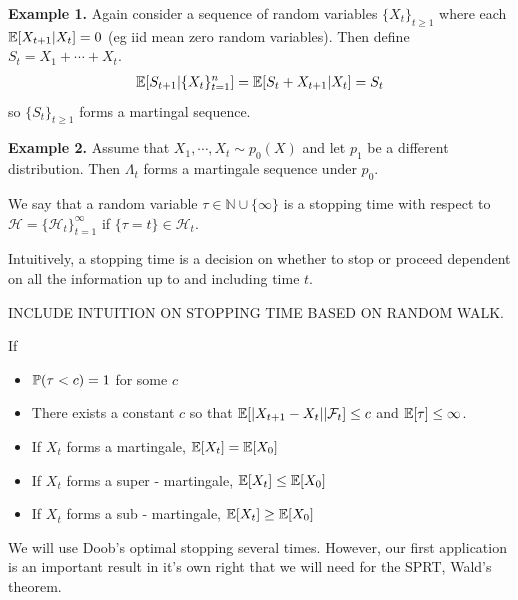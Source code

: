 \noindent\textbf{Example 1.} Again consider a sequence of random variables $\{X_t\}_{t\geq 1}$ where each $\E[X_{t+1}|X_t] = 0$ (eg iid mean zero random variables). Then define $S_t = X_1+\cdots + X_t$.
\begin{align*}
    \E[S_{t+1}|\{X_t\}_{t=1}^n] = \E[S_{t} + X_{t+1}|X_t] = S_t 
\end{align*}
so $\{S_t\}_{t\geq 1}$ forms a martingal sequence.

\noindent\textbf{Example 2.} Assume that $X_1, \cdots, X_t\sim p_0(X)$ and let $p_1$ be a different distribution. Then $\Lambda_t$ forms a martingale sequence under $p_0$.


\begin{definition}
    We say that a random variable $\tau\in \mathbb{N}\cup \{\infty\}$ is a stopping time with respect to $\mathcal{H} = \{\mathcal{H}_t\}_{t=1}^{\infty}$ if $\{\tau = t\}\in \mathcal{H}_t$.
\end{definition}
Intuitively, a stopping time is a decision on whether to stop or proceed dependent on all the information up to and including time $t$.

INCLUDE INTUITION ON STOPPING TIME BASED ON RANDOM WALK.

\begin{theorem}
If 
\begin{itemize}
\item $\P(\tau < c) = 1$ for some $c$
\item There exists a constant $c$ so that $\E[|X_{t+1} - X_t||\mathcal{F}_t] \leq c$ and $\E[\tau] \leq \infty$.
\end{itemize}
\begin{itemize}
    \item If $X_t$ forms a martingale, $\E[X_t] = \E[X_0]$
    \item If $X_t$ forms a super - martingale, $\E[X_t] \leq \E[X_0]$
    \item If $X_t$ forms a sub - martingale, $\E[X_t] \geq \E[X_0]$
\end{itemize}
\end{theorem}

We will use Doob's optimal stopping several times. However, our first application is an important result in it's own right that we will need for the SPRT, Wald's theorem.

